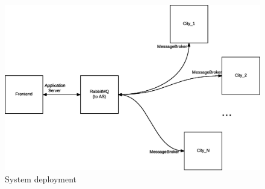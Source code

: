 \begin{figure}[H]
  \centering
  \includegraphics[scale=0.4,keepaspectratio]
    {images/overall/deployment.eps}
  \caption{System deployment}
  \label{fig:ovrl-deployment}
\end{figure}

